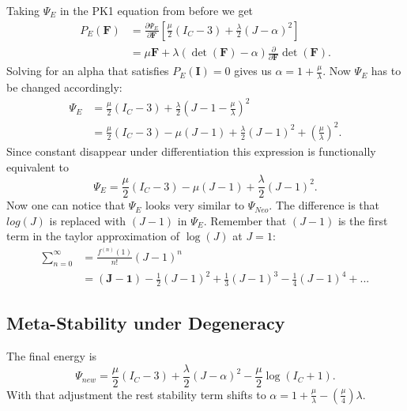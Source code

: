 Taking $\Psi_E$ in the PK1 equation from before we get
\begin{align*}
P_{E}(\mathbf{F}) &= \frac{\partial \Psi_{E}}{\partial \mathbf{F}} \left[ \frac{\mu}{2}\left(I_{C}-3\right) +\frac{\lambda}{2}(J-\alpha)^{2} \right] \\
&= \mu \mathbf{F} + \lambda (\operatorname{det}(\mathbf{F})-\alpha)  \frac{\partial}{\partial \mathbf{F}} \operatorname{det}(\mathbf{F}).
\end{align*}
Solving for an alpha that satisfies $P_{E}(\mathbf{I})=0$ gives us $\alpha=1+\frac{\mu}{\lambda}$. Now $\Psi_{E}$ has to be changed accordingly:
\begin{align*}
\Psi_{E} &= \frac{\mu}{2}\left(I_{C}-3\right) +\frac{\lambda}{2}(J-1-\frac{\mu}{\lambda})^{2} \\
&= \frac{\mu}{2}\left(I_{C}-3\right) - \mu\left(J-1\right) + \frac{\lambda}{2}(J-1)^{2} + \left(\frac{\mu}{\lambda}\right)^{2}.
\end{align*}
Since constant disappear under differentiation this expression is functionally equivalent to 
\[
\Psi_{E} = \frac{\mu}{2}\left(I_{C}-3\right) - \mu\left(J-1\right) + \frac{\lambda}{2}(J-1)^{2}.
\]
Now one can notice that $\Psi_{E}$ looks very similar to $\Psi_{Neo}$. The difference is that $log(J)$ is replaced with $(J-1)$ in $\Psi_{E}$. Remember that $(J-1)$ is the first term in the taylor approximation of $\operatorname{log}(J)$ at $J=1$:
\begin{align*}
\sum_{n=0}^{\infty} &= \frac{f^{(n)}(1)}{n!} (J-1)^{n} \\
&= \boldsymbol{(J-1)} - \frac{1}{2} (J-1)^{2} + \frac{1}{3} (J-1)^{3} -\frac{1}{4} (J-1)^{4} + ...
\end{align*}


\subsection{Meta-Stability under Degeneracy}
The final energy is
\begin{equation}\label{eq:stable_energy}
\Psi_{new} = \frac{\mu}{2}\left(I_{C}-3\right) + \frac{\lambda}{2}(J-\alpha)^{2} - \frac{\mu}{2} \operatorname{log}\left(I_{C}+1\right).
\end{equation}
With that adjustment the rest stability term shifts to $\alpha=1+\frac{\mu}{\lambda}-\left(\frac{\mu}{4}\right)\lambda$.

